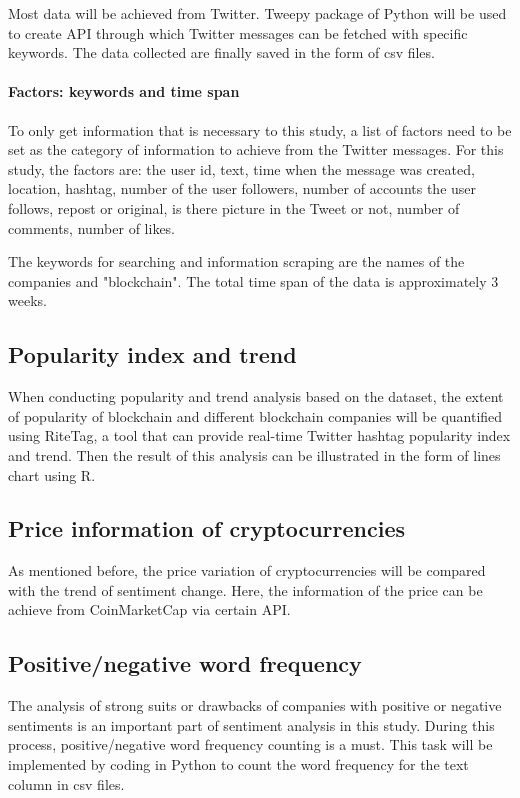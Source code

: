 \documentclass{article}
\begin{document}
Most data will be achieved from Twitter. Tweepy package of Python will be used to create API through which Twitter messages can be fetched with specific keywords. The data collected are finally saved in the form of csv files. 

\paragraph{Factors: keywords and time span}
To only get information that is necessary to this study, a list of factors need to be set as the category of information to achieve from the Twitter messages. For this study, the factors are: the user id, text, time when the message was created, location, hashtag, number of the user followers, number of accounts the user follows, repost or original, is there picture in the Tweet or not, number of comments, number of likes. 


The keywords for searching and information scraping are the names of the companies and "blockchain". The total time span of the data is approximately 3 weeks.
\subsection{Popularity index and trend}
When conducting popularity and trend analysis based on the dataset, the extent of popularity of blockchain and different blockchain companies will be quantified using RiteTag, a tool that can provide real-time Twitter hashtag popularity index and trend. Then the result of this analysis can be illustrated in the form of lines chart using R.

\subsection{Price information of cryptocurrencies}
As mentioned before, the price variation of cryptocurrencies will be compared with the trend of sentiment change. Here, the information of the price can be achieve from CoinMarketCap via certain API.

\subsection{Positive/negative word frequency}
The analysis of strong suits or drawbacks of companies with positive or negative sentiments is an important part of sentiment analysis in this study. During this process, positive/negative word frequency counting is a must. This task will be implemented by coding in Python to count the word frequency for the text column in csv files.
\end{document}
